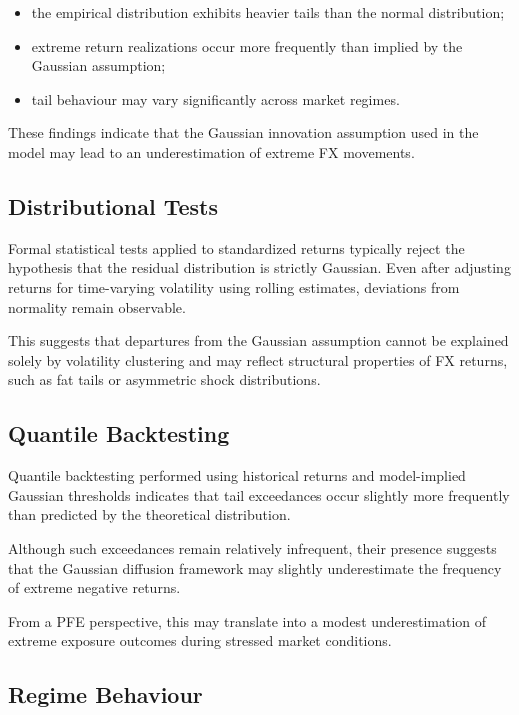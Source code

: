 \begin{itemize}
	
	\item the empirical distribution exhibits heavier tails than the normal distribution;
	
	\item extreme return realizations occur more frequently than implied by the Gaussian assumption;
	
	\item tail behaviour may vary significantly across market regimes.
	
\end{itemize}

These findings indicate that the Gaussian innovation assumption used in the model may lead to an underestimation of extreme FX movements.

\subsection{Distributional Tests}

Formal statistical tests applied to standardized returns typically reject the hypothesis that the residual distribution is strictly Gaussian. Even after adjusting returns for time-varying volatility using rolling estimates, deviations from normality remain observable.

This suggests that departures from the Gaussian assumption cannot be explained solely by volatility clustering and may reflect structural properties of FX returns, such as fat tails or asymmetric shock distributions.

\subsection{Quantile Backtesting}

Quantile backtesting performed using historical returns and model-implied Gaussian thresholds indicates that tail exceedances occur slightly more frequently than predicted by the theoretical distribution.

Although such exceedances remain relatively infrequent, their presence suggests that the Gaussian diffusion framework may slightly underestimate the frequency of extreme negative returns.

From a PFE perspective, this may translate into a modest underestimation of extreme exposure outcomes during stressed market conditions.

\subsection{Regime Behaviour}


